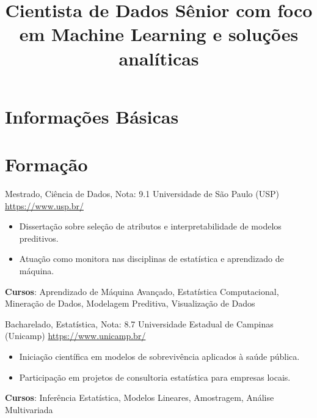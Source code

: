 \documentclass[a4paper, serif, 10pt]{moderncv}
\title{Cientista de Dados Sênior com foco em Machine Learning e soluções analíticas}
\begin{document}
\maketitle

\section{Informações Básicas}

\section{Formação}

        {Mestrado, Ciência de Dados, Nota: 9.1}
        {Universidade de São Paulo (USP)}
        {\url{https://www.usp.br/}}
        {}
        {\begin{itemize}
\item Dissertação sobre seleção de atributos e interpretabilidade de modelos preditivos.
\item Atuação como monitora nas disciplinas de estatística e aprendizado de máquina.
\end{itemize}
\textbf{Cursos}: Aprendizado de Máquina Avançado, Estatística Computacional, Mineração de Dados, Modelagem Preditiva, Visualização de Dados}

        {Bacharelado, Estatística, Nota: 8.7}
        {Universidade Estadual de Campinas (Unicamp)}
        {\url{https://www.unicamp.br/}}
        {}
        {\begin{itemize}
\item Iniciação científica em modelos de sobrevivência aplicados à saúde pública.
\item Participação em projetos de consultoria estatística para empresas locais.
\end{itemize}
\textbf{Cursos}: Inferência Estatística, Modelos Lineares, Amostragem, Análise Multivariada}
\end{document}
